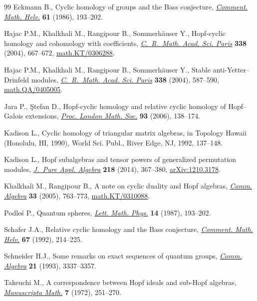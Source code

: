 \documentclass[11pt]{article}
\numberwithin{equation}{section}
\let\originalcedilla\c
\renewcommand{\c}[1]{{\fontspec{DejaVu Serif}\originalcedilla{#1}}}
\begin{document}
\begin{thebibliography}{99}
Eckmann B., Cyclic homology of groups and the {B}ass conjecture,
  \href{http://dx.doi.org/10.1007/BF02621911}{\textit{Comment. Math. Helv.}} \textbf{61} (1986), 193--202.

Hajac P.M., Khalkhali M., Rangipour B., Sommerh{\"a}user Y., Hopf-cyclic
  homology and cohomology with coef\/f\/icients, \href{http://dx.doi.org/10.1016/j.crma.2003.11.036}{\textit{C.~R.~Math. Acad. Sci.
  Paris}} \textbf{338} (2004), 667--672, \href{http://arxiv.org/abs/math.KT/0306288}{math.KT/0306288}.

Hajac P.M., Khalkhali M., Rangipour B., Sommerh{\"a}user Y., Stable
  anti-{Y}etter--{D}rinfeld modules, \href{http://dx.doi.org/10.1016/j.crma.2003.11.037}{\textit{C.~R.~Math. Acad. Sci. Paris}}
  \textbf{338} (2004), 587--590, \href{http://arxiv.org/abs/math.QA/0405005}{math.QA/0405005}.

Jara P., {\c{S}}tefan D., Hopf-cyclic homology and relative cyclic homology of
  {H}opf--{G}alois extensions, \href{http://dx.doi.org/10.1017/S0024611506015772}{\textit{Proc. London Math. Soc.}} \textbf{93}
  (2006), 138--174.

Kadison L., Cyclic homology of triangular matrix algebras, in Topology {H}awaii
  ({H}onolulu, {HI}, 1990), World Sci. Publ., River Edge, NJ, 1992, 137--148.

Kadison L., Hopf subalgebras and tensor powers of generalized permutation
  modules, \href{http://dx.doi.org/10.1016/j.jpaa.2013.06.008}{\textit{J.~Pure Appl. Algebra}} \textbf{218} (2014), 367--380,
  \href{http://arxiv.org/abs/1210.3178}{arXiv:1210.3178}.

Khalkhali M., Rangipour B., A note on cyclic duality and {H}opf algebras,
  \href{http://dx.doi.org/10.1081/AGB-200051130}{\textit{Comm. Algebra}} \textbf{33} (2005), 763--773,
  \href{http://arxiv.org/abs/math.KT/0310088}{math.KT/0310088}.

Podle{\'s} P., Quantum spheres, \href{http://dx.doi.org/10.1007/BF00416848}{\textit{Lett. Math. Phys.}} \textbf{14} (1987),
  193--202.

Schafer J.A., Relative cyclic homology and the {B}ass conjecture,
  \href{http://dx.doi.org/10.1007/BF02566497}{\textit{Comment. Math. Helv.}} \textbf{67} (1992), 214--225.

Schneider H.J., Some remarks on exact sequences of quantum groups,
  \href{http://dx.doi.org/10.1080/00927879308824733}{\textit{Comm. Algebra}} \textbf{21} (1993), 3337--3357.

Takeuchi M., A correspondence between {H}opf ideals and sub-{H}opf algebras,
  \href{http://dx.doi.org/10.1007/BF01579722}{\textit{Manuscripta Math.}} \textbf{7} (1972), 251--270.

\end{thebibliography}
\end{document}
